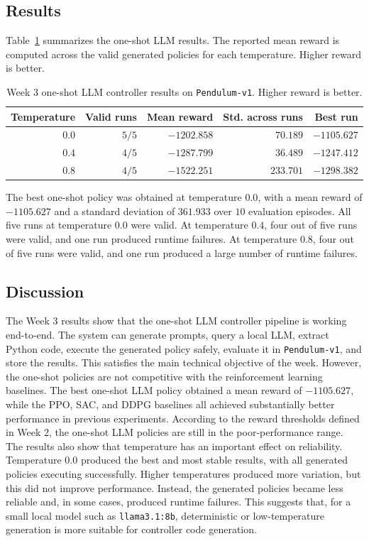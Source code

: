 \documentclass[11pt,a4paper]{article}
\begin{document}
\subsection{Results}

Table~\ref{tab:week3_one_shot_results} summarizes the one-shot LLM results. The reported mean reward is computed across the valid generated policies for each temperature. Higher reward is better.

\begin{table}[h]
\centering
\caption{Week 3 one-shot LLM controller results on \texttt{Pendulum-v1}. Higher reward is better.}
\label{tab:week3_one_shot_results}
\begin{tabular}{|r|r|r|r|r|}
\hline
Temperature & Valid runs & Mean reward & Std. across runs & Best run \\
\hline
$0.0$ & $5/5$ & $-1202.858$ & $70.189$ & $-1105.627$ \\
$0.4$ & $4/5$ & $-1287.799$ & $36.489$ & $-1247.412$ \\
$0.8$ & $4/5$ & $-1522.251$ & $233.701$ & $-1298.382$ \\
\hline
\end{tabular}
\end{table}

The best one-shot policy was obtained at temperature $0.0$, with a mean reward of $-1105.627$ and a standard deviation of $361.933$ over $10$ evaluation episodes. All five runs at temperature $0.0$ were valid. At temperature $0.4$, four out of five runs were valid, and one run produced runtime failures. At temperature $0.8$, four out of five runs were valid, and one run produced a large number of runtime failures.

\subsection{Discussion}

The Week 3 results show that the one-shot LLM controller pipeline is working end-to-end. The system can generate prompts, query a local LLM, extract Python code, execute the generated policy safely, evaluate it in \texttt{Pendulum-v1}, and store the results. This satisfies the main technical objective of the week.
However, the one-shot policies are not competitive with the reinforcement learning baselines. The best one-shot LLM policy obtained a mean reward of $-1105.627$, while the PPO, SAC, and DDPG baselines all achieved substantially better performance in previous experiments. According to the reward thresholds defined in Week 2, the one-shot LLM policies are still in the poor-performance range.
The results also show that temperature has an important effect on reliability. Temperature $0.0$ produced the best and most stable results, with all generated policies executing successfully. Higher temperatures produced more variation, but this did not improve performance. Instead, the generated policies became less reliable and, in some cases, produced runtime failures. This suggests that, for a small local model such as \texttt{llama3.1:8b}, deterministic or low-temperature generation is more suitable for controller code generation.
\end{document}
